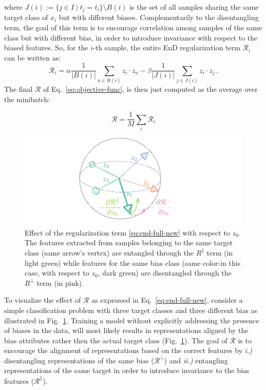 where $J(i) := \{ j \in I \mid t_j = t_i \} \setminus B(i)$ is the set of all samples sharing the same target class of $x_i$ but with different biases. %
Complementarily to the disentangling term, the goal of this term is to encourage correlation among samples of the same class but with different bias, in order to introduce invariance with respect to the biased features.
So, for the $i$-th sample, the entire EnD regularization term $\mathcal{R}_i$ can be written as: 
\begin{equation}
\label{eq:end-full-new}
  \mathcal{R}_i =  \alpha\frac{1}{|B(i)|} \sum_{a \in B(i)} z_i \cdot z_a - \beta \frac{1}{|J(i)|}\sum_{j \in J(i)} z_i \cdot z_j \,. 
\end{equation}
The final $\mathcal{R}$ of Eq.~\ref{eq:objective-func}, is then just computed as the average over the minibatch: 

\begin{equation}
    \mathcal{R} = \frac{1}{M}\sum_i \mathcal{R}_i
\end{equation}
\begin{figure}
    \centering
    \includegraphics[width=0.6\columnwidth,trim={110 10 140 0},clip]{img/notation.pdf}
    \caption{Effect of the regularization term \eqref{eq:end-full-new} with respect to $z_0$. The features extracted from samples belonging to the same target class (same arrow's vertex) are entangled through the $R^\parallel$ term (in light green) while features for the same bias class (same color-in this case, with respect to $z_0$, dark green) are disentangled through the $R^\perp$ term (in pink).}
    \label{fig:notation}
\end{figure}
To visualize the effect of $\mathcal{R}$ as expressed in Eq.~\ref{eq:end-full-new}, consider a simple classification problem with three target classes and three different bias as illustrated in Fig.~\ref{fig:notation}. %
Training a model without explicitly addressing the presence of biases in the data, will most likely results in representations aligned by the bias attributes rather then the actual target class (Fig.~\ref{fig:notation}). 
The goal of $\mathcal{R}$ is to encourage the alignment of representations based on the correct features by \emph{i.)} disentangling representations of the same bias ($\mathcal{R}^\perp$) and \emph{ii.)} entangling representations of the same target in order to introduce invariance to the bias features ($\mathcal{R}^\parallel$).

